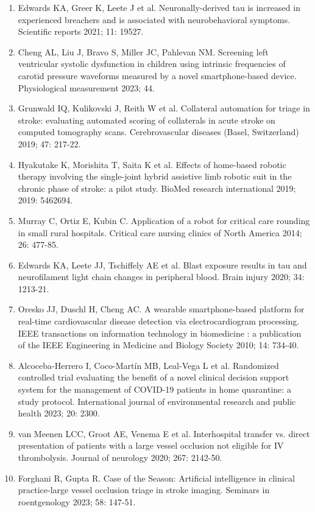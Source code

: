 {{\begin{enumerate}
    \item Edwards KA, Greer K, Leete J et al. Neuronally-derived tau is increased in experienced breachers and is associated with neurobehavioral symptoms. Scientific reports 2021; 11: 19527.
    \item Cheng AL, Liu J, Bravo S, Miller JC, Pahlevan NM. Screening left ventricular systolic dysfunction in children using intrinsic frequencies of carotid pressure waveforms measured by a novel smartphone-based device. Physiological measurement 2023; 44.
    \item Grunwald IQ, Kulikovski J, Reith W et al. Collateral automation for triage in stroke: evaluating automated scoring of collaterals in acute stroke on computed tomography scans. Cerebrovascular diseases (Basel, Switzerland) 2019; 47: 217-22.
    \item Hyakutake K, Morishita T, Saita K et al. Effects of home-based robotic therapy involving the single-joint hybrid assistive limb robotic suit in the chronic phase of stroke: a pilot study. BioMed research international 2019; 2019: 5462694.
    \item Murray C, Ortiz E, Kubin C. Application of a robot for critical care rounding in small rural hospitals. Critical care nursing clinics of North America 2014; 26: 477-85.
    \item Edwards KA, Leete JJ, Tschiffely AE et al. Blast exposure results in tau and neurofilament light chain changes in peripheral blood. Brain injury 2020; 34: 1213-21.
    \item Oresko JJ, Duschl H, Cheng AC. A wearable smartphone-based platform for real-time cardiovascular disease detection via electrocardiogram processing. IEEE transactions on information technology in biomedicine : a publication of the IEEE Engineering in Medicine and Biology Society 2010; 14: 734-40.
    \item Alcoceba-Herrero I, Coco-Martín MB, Leal-Vega L et al. Randomized controlled trial evaluating the benefit of a novel clinical decision support system for the management of COVID-19 patients in home quarantine: a study protocol. International journal of environmental research and public health 2023; 20: 2300.
    \item van Meenen LCC, Groot AE, Venema E et al. Interhospital transfer vs. direct presentation of patients with a large vessel occlusion not eligible for IV thrombolysis. Journal of neurology 2020; 267: 2142-50.
    \item Forghani R, Gupta R. Case of the Season: Artificial intelligence in clinical practice-large vessel occlusion triage in stroke imaging. Seminars in roentgenology 2023; 58: 147-51.

\end{enumerate}}}

